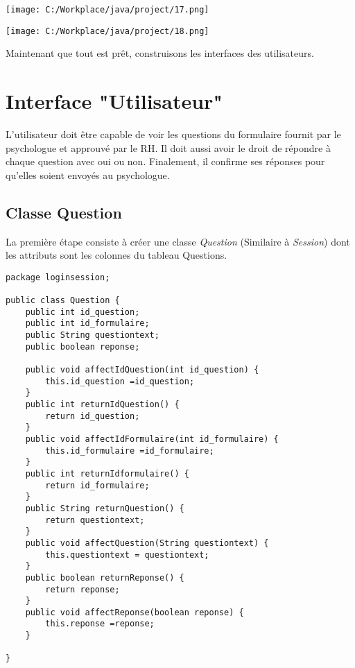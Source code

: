 \documentclass[12]{article}
\begin{document}
 



\begin{center}
\hspace*{-2cm}\texttt{[image: C:/Workplace/java/project/17.png]}

\vspace{1cm}
\hspace*{-3cm}\texttt{[image: C:/Workplace/java/project/18.png]}
\end{center}


Maintenant que tout est prêt, construisons les interfaces des utilisateurs.\\

\section{Interface "Utilisateur"}
\indent


L'utilisateur doit être capable de voir les questions du formulaire fournit par le psychologue et approuvé par le RH. Il doit aussi avoir le droit de répondre à chaque question avec oui ou non. Finalement, il confirme ses réponses pour qu'elles soient envoyés au psychologue.\\
\subsection{Classe Question}

La première étape consiste à créer une classe \textit{Question} (Similaire à \textit{Session}) dont les attributs sont les colonnes du tableau Questions. \\





\lstset{language=java}
\begin{lstlisting}
package loginsession;

public class Question {
	public int id_question;
	public int id_formulaire;
	public String questiontext;
	public boolean reponse;
	
	public void affectIdQuestion(int id_question) {
		this.id_question =id_question;
	}
	public int returnIdQuestion() {
		return id_question;
	}
	public void affectIdFormulaire(int id_formulaire) {
		this.id_formulaire =id_formulaire;
	}
	public int returnIdformulaire() {
		return id_formulaire;
	}
	public String returnQuestion() {
		return questiontext;
	}
	public void affectQuestion(String questiontext) {
		this.questiontext = questiontext;
	}
	public boolean returnReponse() {
		return reponse;
	}
	public void affectReponse(boolean reponse) {
		this.reponse =reponse;
	}
	
}
\end{lstlisting}
\end{document}
